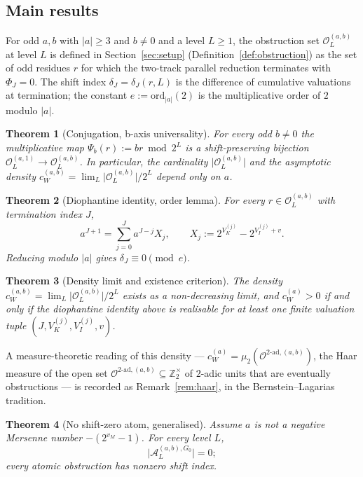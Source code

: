 \documentclass[11pt,reqno]{amsart}
\theoremstyle{plain}
\newtheorem{theorem}{Theorem}[section]
\theoremstyle{definition}
\theoremstyle{remark}
\newcommand{\Ztwox}{\mathbb{Z}_{2}^{\times}}
\newcommand{\Obs}{\mathcal{O}}
\newcommand{\Atom}{\mathcal{A}}
\newcommand{\Vk}{V_{K}}
\newcommand{\Vi}{V_{I}}
\newcommand{\ord}{\mathrm{ord}}
\newcommand{\Psib}{\Psi_{b}}
\newcommand{\cWa}{c_{W}^{(a)}}
\newcommand{\cWab}{c_{W}^{(a,b)}}
\newcommand{\Obsab}{\Obs_{L}^{(a,b)}}
\newcommand{\Obstad}{\Obs^{\mathrm{2{\text{-}}ad},(a,b)}}
\begin{document}
\subsection{Main results}

For odd $a, b$ with $\lvert a \rvert \ge 3$ and $b \ne 0$ and a level $L
\ge 1$, the obstruction set $\Obsab$ at level $L$ is defined in
Section~\ref{sec:setup} (Definition~\ref{def:obstruction}) as the set
of odd residues $r$ for which the two-track parallel reduction
terminates with $\Phi_J = 0$. The shift index $\delta_J = \delta_J(r,L)$
is the difference of cumulative valuations at termination; the constant
$e := \ord_{\lvert a \rvert}(2)$ is the multiplicative order of $2$
modulo $\lvert a \rvert$.

\begin{theorem}[Conjugation, b-axis universality]\label{thm:conjugation-intro}
For every odd $b \ne 0$ the multiplicative map $\Psib(r) := br \bmod 2^L$
is a shift-preserving bijection $\Obs_L^{(a,1)} \to \Obsab$. In
particular, the cardinality $\lvert\Obsab\rvert$ and the asymptotic
density $\cWab = \lim_L \lvert\Obsab\rvert/2^L$ depend only on $a$.
\end{theorem}

\begin{theorem}[Diophantine identity, order lemma]\label{thm:order-intro}
For every $r \in \Obsab$ with termination index $J$,
\[
a^{J+1} = \sum_{j=0}^{J} a^{J-j} X_j, \qquad X_j := 2^{\Vk^{(j)}} - 2^{\Vi^{(j)} + v}.
\]
Reducing modulo $\lvert a \rvert$ gives $\delta_J \equiv 0 \pmod{e}$.
\end{theorem}

\begin{theorem}[Density limit and existence criterion]\label{thm:adic-intro}
The density $\cWab = \lim_L \lvert \Obsab \rvert / 2^L$ exists as a
non-decreasing limit, and $\cWa > 0$ if and only if the diophantine
identity above is realisable for at least one finite valuation tuple
$(J, \Vk^{(j)}, \Vi^{(j)}, v)$.
\end{theorem}

\noindent A measure-theoretic reading of this density --- $\cWa =
\mu_2(\Obstad)$, the Haar measure of the open set $\Obstad \subseteq
\Ztwox$ of $2$-adic units that are eventually obstructions --- is recorded
as Remark~\ref{rem:haar}, in the Bernstein--Lagarias tradition.

\begin{theorem}[No shift-zero atom, generalised]\label{thm:no-G0-intro}
Assume $a$ is not a negative Mersenne number $-(2^{v_M} - 1)$. For every
level $L$,
\[
\lvert \Atom_L^{(a,b), G_0} \rvert = 0;
\]
every atomic obstruction has nonzero shift index.
\end{theorem}
\end{document}
